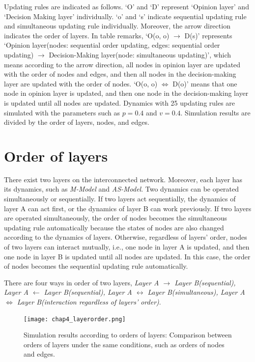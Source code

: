 Updating rules are indicated as follows. `O' and `D'  represent `Opinion layer' and `Decision Making layer' individually. `o' and `s' indicate sequential updating rule and simultaneous updating rule individually. Moreover, the arrow direction indicates the order of layers. In table remarks, `O(o, o) $\to$ D(s)' represents `Opinion layer(nodes: sequential order updating, edges: sequential order updating) $\to$ Decision-Making layer(node: simultaneous updating)', which means according to the arrow direction, all nodes in opinion layer are updated with the order of nodes and edges, and then all nodes in the decision-making layer are updated with the order of nodes. `O(o, o) $\Leftrightarrow$ D(o)' means that one node in opinion layer is updated, and then one node in the decision-making layer is updated until all nodes are updated. Dynamics with 25 updating rules are simulated with the parameters such as $p=0.4$ and $v=0.4$. Simulation results are divided by the order of layers, nodes, and edges. \\

\section{Order of layers}
There exist two layers on the interconnected network. Moreover, each layer has its dynamics, such as \textit{M-Model} and \textit{AS-Model}. Two dynamics can be operated simultaneously or sequentially. If two layers act sequentially, the dynamics of layer A can act first, or the dynamics of layer B can work previously. If two layers are operated simultaneously, the order of nodes becomes the simultaneous updating rule automatically because the states of nodes are also changed according to the dynamics of layers. Otherwise, regardless of layers' order, nodes of two layers can interact mutually, i.e., one node in layer A is updated, and then one node in layer B is updated until all nodes are updated. In this case, the order of nodes becomes the sequential updating rule automatically.

There are four ways in order of two layers, \textit{Layer A $\to$ Layer B(sequential), Layer A $\leftarrow$ Layer B(sequential), Layer A $\leftrightarrow$ Layer B(simultaneous), Layer A $\Leftrightarrow$ Layer B(interaction regardless of layers' order)}. 

\begin{figure}[!htb]
	\centering
	\texttt{[image: chap4\_layerorder.png]}
	\caption{Simulation results according to orders of layers: Comparison between orders of layers under the same conditions, such as orders of nodes and edges.}
	\label{chap4_layerorder}
\end{figure}

